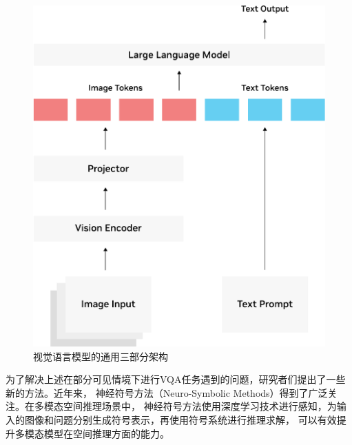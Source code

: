 \begin{figure}[htb]
    \centering
    \includegraphics[scale=0.6]{figures/vlm-architecture-diagram-crop.pdf}
    \caption{视觉语言模型的通用三部分架构}
    \label{fig:vlm-architecture}
\end{figure}

为了解决上述在部分可见情境下进行VQA任务遇到的问题，研究者们提出了一些新的方法。近年来，
神经符号方法（Neuro-Symbolic Methods）得到了广泛关注。在多模态空间推理场景中，
神经符号方法使用深度学习技术进行感知，为输入的图像和问题分别生成符号表示，再使用符号系统进行推理求解，
可以有效提升多模态模型在空间推理方面的能力\cite{premsri2025neurosymbolictrainingreasoningspatial}。

